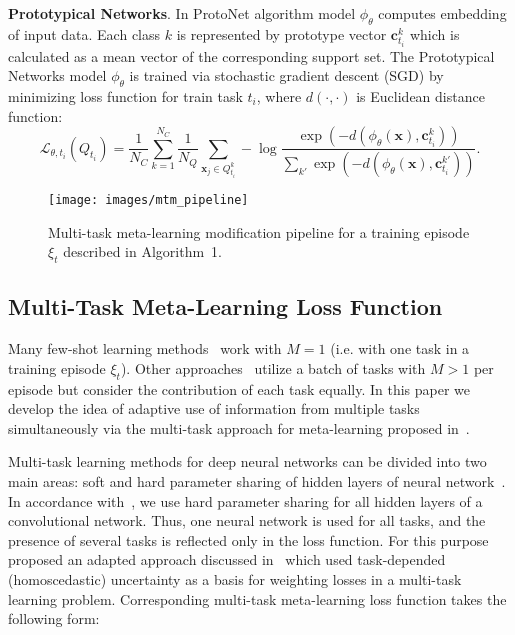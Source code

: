 \documentclass{article}
\begin{document}
{\bf Prototypical Networks}. In ProtoNet algorithm model $\phi_{\theta}$ computes embedding of input data. Each class $k$ is represented by prototype vector $\mathbf{c}^k_{t_i}$ which is calculated as a mean vector of the corresponding support set. The Prototypical Networks model $\phi_{\theta}$ is trained via stochastic gradient descent (SGD) by minimizing loss function for train task $t_i$, where $d(\cdot, \cdot)$ is Euclidean distance function:
\begin{equation}
\mathcal{L}_{\theta, t_i} (Q_{t_i}) = \frac{1}{N_C} \sum_{k=1}^{N_C} \frac{1}{N_Q} \sum_{\mathbf{x}_j \in Q_{t_i}^k} -\log \frac{\exp(-d(\phi_\theta (\mathbf{x}), \mathbf{c}^k_{t_i}))}{\sum_{k'} \exp(-d(\phi_\theta (\mathbf{x}), \mathbf{c}^{k'}_{t_i}))}.
\end{equation}
\begin{figure*}[t]
  \centering
  \texttt{[image: images/mtm\_pipeline]}
  \caption{Multi-task meta-learning modification pipeline for a training episode $\xi_t$ described in Algorithm~1.}
  \label{fig:mtm_pipeline}
\end{figure*}

\subsection{Multi-Task Meta-Learning Loss Function}

Many few-shot learning methods~\cite{vinyals2016matching,NIPS2017_cb8da676,8954109} work with $M=1$ (i.e. with one task in a training episode $\xi_t$). Other approaches~\cite{finn2017model,mishra2017simple} utilize a batch of tasks with $M > 1$ per episode but consider the contribution of each task equally. In this paper we develop the idea of adaptive use of information from multiple tasks simultaneously via the multi-task approach for meta-learning proposed in~\cite{boiarov2020simultaneous}.

Multi-task learning methods for deep neural networks can be divided into two main areas: soft and hard parameter sharing of hidden layers of neural network~\cite{ruder2017overview}. In accordance with~\cite{boiarov2020simultaneous}, we use hard parameter sharing for all hidden layers of a convolutional network. Thus, one neural network is used for all tasks, and the presence of several tasks is reflected only in the loss function. For this purpose~\cite{boiarov2020simultaneous} proposed an adapted approach discussed in~\cite{kendall2018multi} which used task-depended (homoscedastic) uncertainty as a basis for weighting losses in a multi-task learning problem. Corresponding multi-task meta-learning loss function takes the following form:
\end{document}
